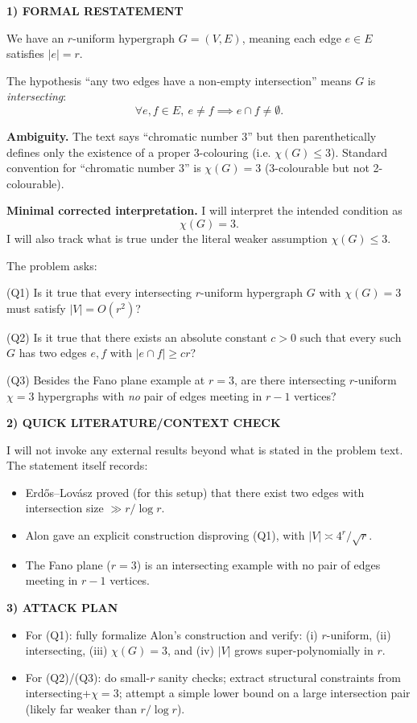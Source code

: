 \medskip
\noindent\textbf{1) FORMAL RESTATEMENT}

We have an $r$-uniform hypergraph $G=(V,E)$, meaning each edge $e\in E$ satisfies $|e|=r$.

The hypothesis ``any two edges have a non-empty intersection'' means $G$ is \emph{intersecting}:
\[
\forall e,f\in E,\ e\neq f \implies e\cap f\neq \emptyset.
\]

\textbf{Ambiguity.} The text says ``chromatic number $3$'' but then parenthetically defines only the existence of a proper $3$-colouring (i.e. $\chi(G)\le 3$). Standard convention for ``chromatic number $3$'' is $\chi(G)=3$ (3-colourable but not 2-colourable).

\textbf{Minimal corrected interpretation.} I will interpret the intended condition as
\[
\chi(G)=3.
\]
I will also track what is true under the literal weaker assumption $\chi(G)\le 3$.

The problem asks:

(Q1) Is it true that every intersecting $r$-uniform hypergraph $G$ with $\chi(G)=3$ must satisfy $|V|=O(r^2)$?

(Q2) Is it true that there exists an absolute constant $c>0$ such that every such $G$ has two edges $e,f$ with $|e\cap f|\ge c r$?

(Q3) Besides the Fano plane example at $r=3$, are there intersecting $r$-uniform $\chi=3$ hypergraphs with \emph{no} pair of edges meeting in $r-1$ vertices?

\medskip
\noindent\textbf{2) QUICK LITERATURE/CONTEXT CHECK}

I will not invoke any external results beyond what is stated in the problem text.
The statement itself records:

\begin{itemize}
\item Erd\H{o}s--Lov\'{a}sz proved (for this setup) that there exist two edges with intersection size $\gg r/\log r$.
\item Alon gave an explicit construction disproving (Q1), with $|V|\asymp 4^r/\sqrt r$.
\item The Fano plane ($r=3$) is an intersecting example with no pair of edges meeting in $r-1$ vertices.
\end{itemize}

\medskip
\noindent\textbf{3) ATTACK PLAN}

\begin{itemize}
\item For (Q1): fully formalize Alon's construction and verify: (i) $r$-uniform, (ii) intersecting, (iii) $\chi(G)=3$, and (iv) $|V|$ grows super-polynomially in $r$.
\item For (Q2)/(Q3): do small-$r$ sanity checks; extract structural constraints from intersecting+$\chi=3$; attempt a simple lower bound on a large intersection pair (likely far weaker than $r/\log r$).
\end{itemize}

